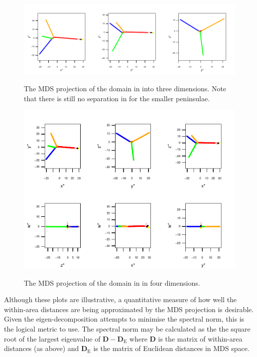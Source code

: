 \begin{figure}
\centering
\includegraphics[width=\textwidth]{mds/figs/comb-3d.pdf} \\
\caption{The MDS projection of the domain in  into three dimensions. Note that there is still no separation in for the smaller peninsulae.}
\label{mds-comb-3d}
\end{figure}

\begin{figure}
\centering
\includegraphics[width=6in]{mds/figs/comb-4d.pdf} \\
\caption{The MDS projection of the domain in  in four dimensions.}
\label{mds-comb-4d}
\end{figure}

Although these plots are illustrative, a quantitative measure of how well the within-area distances are being approximated by the MDS projection is desirable. Given the eigen-decomposition attempts to minimise the spectral norm, this is the logical metric to use. The spectral norm may be calculated as the the square root of the largest eigenvalue of $\mathbf{D}-\mathbf{D}_\text{E}$ where $\mathbf{D}$ is the matrix of within-area distances (as above) and $\mathbf{D}_\text{E}$ is the matrix of Euclidean distances in MDS space.


